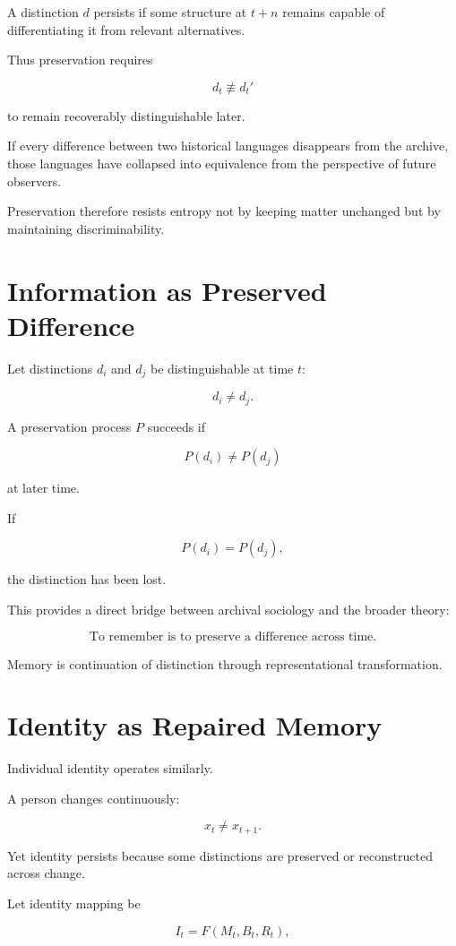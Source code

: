 \documentclass[11pt,oneside]{book}
\theoremstyle{definition}
\theoremstyle{remark}
\begin{document}
A distinction \(d\) persists if some structure at \(t+n\) remains capable of differentiating it from relevant alternatives.

Thus preservation requires

\[
d_t
\not\equiv
d_t'
\]

to remain recoverably distinguishable later.

If every difference between two historical languages disappears from the archive, those languages have collapsed into equivalence from the perspective of future observers.

Preservation therefore resists entropy not by keeping matter unchanged but by maintaining discriminability.

\section{Information as Preserved Difference}

Let distinctions \(d_i\) and \(d_j\) be distinguishable at time \(t\):

\[
d_i\neq d_j.
\]

A preservation process \(P\) succeeds if

\[
P(d_i)\neq P(d_j)
\]

at later time.

If

\[
P(d_i)=P(d_j),
\]

the distinction has been lost.

This provides a direct bridge between archival sociology and the broader theory:

\[
\boxed{
\text{To remember is to preserve a difference across time.}
}
\]

Memory is continuation of distinction through representational transformation.

\section{Identity as Repaired Memory}

Individual identity operates similarly.

A person changes continuously:

\[
x_t\neq x_{t+1}.
\]

Yet identity persists because some distinctions are preserved or reconstructed across change.

Let identity mapping be

\[
I_t
=
F(M_t,B_t,R_t),
\]
\end{document}
